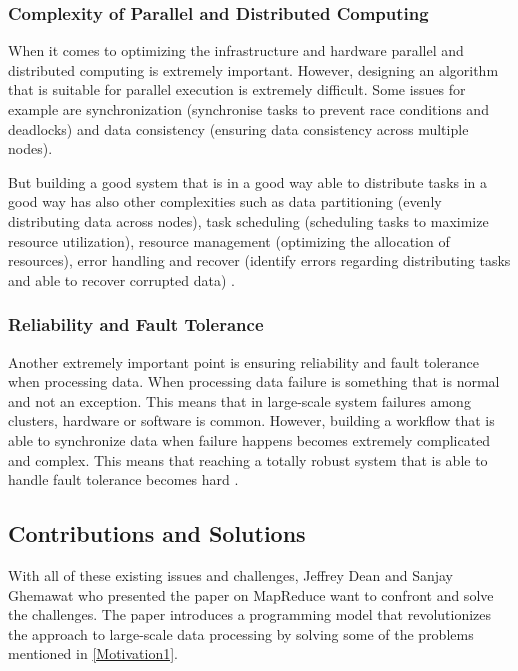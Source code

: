 \documentclass[10pt]{proc}
\begin{document}
\subsubsection{Complexity of Parallel and Distributed Computing}
When it comes to optimizing the infrastructure and hardware parallel and distributed computing is extremely important. However, designing an algorithm that is suitable for parallel execution is extremely difficult. Some issues for example are synchronization (synchronise tasks to prevent race conditions and deadlocks) and data consistency (ensuring data consistency across multiple nodes).

But building a good system that is in a good way able to distribute tasks in a good way has also other complexities such as data partitioning (evenly distributing data across nodes), task scheduling (scheduling tasks to maximize resource utilization), resource management (optimizing the allocation of resources), error handling and recover (identify errors regarding distributing tasks and able to recover corrupted data) \cite{singh2013review}.

\subsubsection{Reliability and Fault Tolerance} \label{Reliability}
Another extremely important point is ensuring reliability and fault tolerance when processing data. When processing data failure is something that is normal and not an exception. This means that in large-scale system failures among clusters, hardware or software is common. However, building a workflow that is able to synchronize data when failure happens becomes extremely complicated and complex. This means that reaching a totally robust system that is able to handle fault tolerance becomes hard \cite{singh2013review}.

\subsection{Contributions and Solutions}
With all of these existing issues and challenges, Jeffrey Dean and Sanjay Ghemawat who presented the paper on MapReduce want to confront and solve the challenges. The paper introduces a programming model that revolutionizes the approach to large-scale data processing by solving some of the problems mentioned in \ref{Motivation1}.
\end{document}
